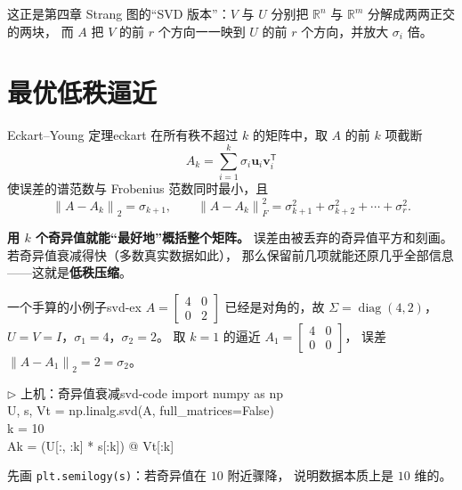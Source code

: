 \documentclass[11pt,a4paper,openany]{ctexbook}
\DeclareMathOperator{\diag}{diag}
\newcommand{\norm}[1]{\left\lVert #1 \right\rVert}
\newcommand{\Rnum}[1]{\mathbb{R}^{#1}}
\begin{document}
这正是第四章 Strang 图的“SVD 版本”：$V$ 与 $U$ 分别把
$\Rnum{n}$ 与 $\Rnum{m}$ 分解成两两正交的两块，
而 $A$ 把 $V$ 的前 $r$ 个方向一一映到 $U$ 的前 $r$ 个方向，并放大 $\sigma_i$ 倍。

\section{最优低秩逼近}

\begin{thm}{Eckart--Young 定理}{eckart}
在所有秩不超过 $k$ 的矩阵中，取 $A$ 的前 $k$ 项截断
\[
A_k=\sum_{i=1}^{k}\sigma_i\boldsymbol{u}_i\boldsymbol{v}_i^{\mathsf T}
\]
使误差的谱范数与 Frobenius 范数同时最小，且
\[
\norm{A-A_k}_2=\sigma_{k+1},\qquad
\norm{A-A_k}_F^2=\sigma_{k+1}^2+\sigma_{k+2}^2+\cdots+\sigma_r^2.
\]
\end{thm}

\begin{keypoint}
\textbf{用 $k$ 个奇异值就能“最好地”概括整个矩阵。}
误差由被丢弃的奇异值平方和刻画。
若奇异值衰减得快（多数真实数据如此），
那么保留前几项就能还原几乎全部信息——这就是\textbf{低秩压缩}。
\end{keypoint}

\begin{exmp}{一个手算的小例子}{svd-ex}
$A=\begin{bmatrix}4&0\\0&2\end{bmatrix}$ 已经是对角的，故
$\Sigma=\diag(4,2)$，$U=V=I$，$\sigma_1=4$，$\sigma_2=2$。
取 $k=1$ 的逼近 $A_1=\begin{bmatrix}4&0\\0&0\end{bmatrix}$，
误差 $\norm{A-A_1}_2=2=\sigma_2$。
\end{exmp}

\begin{remk}{$\triangleright$ 上机：奇异值衰减}{svd-code}
{\small\ttfamily
import numpy as np\\
U, s, Vt = np.linalg.svd(A, full\_matrices=False)\\
k = 10\\
Ak = (U[:, :k] * s[:k]) @ Vt[:k]}
\par\smallskip
\noindent 先画 \texttt{plt.semilogy(s)}：若奇异值在 $10$ 附近骤降，
说明数据本质上是 $10$ 维的。
\end{remk}
\end{document}
